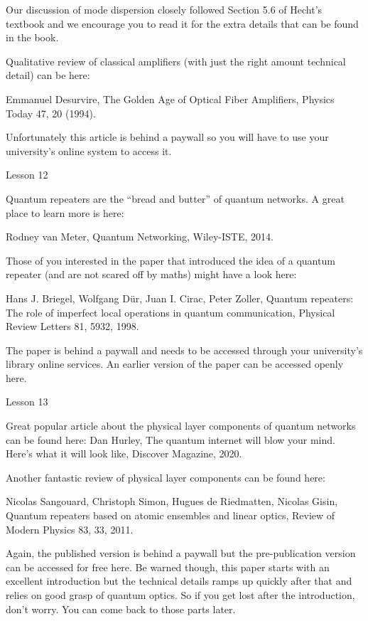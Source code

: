 Our discussion of mode dispersion closely followed Section 5.6 of Hecht’s textbook and we encourage you to read it for the extra details that can be found in the book.

Qualitative review of classical amplifiers (with just the right amount technical detail) can be here:

Emmanuel Desurvire, The Golden Age of Optical Fiber Amplifiers, Physics Today 47, 20 (1994).

Unfortunately this article is behind a paywall so you will have to use your university’s online system to access it.

Lesson 12

Quantum repeaters are the “bread and butter” of quantum networks. A great place to learn more is here:

Rodney van Meter, Quantum Networking, Wiley-ISTE, 2014.

Those of you interested in the paper that introduced the idea of a quantum repeater (and are not scared off by maths) might have a look here:

Hans J. Briegel, Wolfgang Dür, Juan I. Cirac, Peter Zoller, Quantum repeaters: The role of imperfect local operations in quantum communication, Physical Review Letters 81, 5932, 1998.

The paper is behind a paywall and needs to be accessed through your university’s library online services. An earlier version of the paper can be accessed openly here.

Lesson 13

Great popular article about the physical layer components of quantum networks can be found here:
Dan Hurley, The quantum internet will blow your mind. Here’s what it will look like, Discover Magazine, 2020.

Another fantastic review of physical layer components can be found here:

Nicolas Sangouard, Christoph Simon, Hugues de Riedmatten, Nicolas Gisin, Quantum repeaters based on atomic ensembles and linear optics, Review of Modern Physics 83, 33, 2011.

Again, the published version is behind a paywall but the pre-publication version can be accessed for free here. Be warned though, this paper starts with an excellent introduction but the technical details ramps up quickly after that and relies on good grasp of quantum optics. So if you get lost after the introduction, don’t worry. You can come back to those parts later.
